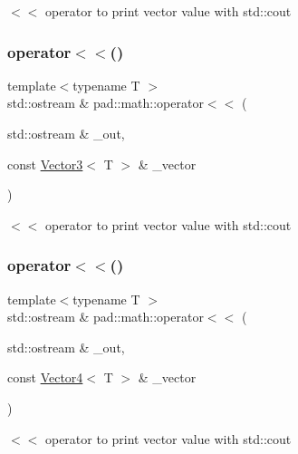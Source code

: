 $<$$<$ operator to print vector value with std\+::cout \mbox{\label{namespacepad_1_1math_a9e468612d54c187ec0eaac48e304e673}} 
\subsubsection{\texorpdfstring{operator$<$$<$()}{operator<<()}\hspace{0.1cm}{\footnotesize\ttfamily [2/3]}}
{\footnotesize\ttfamily template$<$typename T $>$ \\
std\+::ostream \& pad\+::math\+::operator$<$$<$ (\begin{DoxyParamCaption}\item[{std\+::ostream \&}]{\+\_\+out,  }\item[{const \mbox{\hyperlink{structpad_1_1math_1_1_vector3}{Vector3}}$<$ T $>$ \&}]{\+\_\+vector }\end{DoxyParamCaption})}

$<$$<$ operator to print vector value with std\+::cout \mbox{\label{namespacepad_1_1math_aea739f95f7147095cec34ccedee7eea2}} 
\subsubsection{\texorpdfstring{operator$<$$<$()}{operator<<()}\hspace{0.1cm}{\footnotesize\ttfamily [3/3]}}
{\footnotesize\ttfamily template$<$typename T $>$ \\
std\+::ostream \& pad\+::math\+::operator$<$$<$ (\begin{DoxyParamCaption}\item[{std\+::ostream \&}]{\+\_\+out,  }\item[{const \mbox{\hyperlink{structpad_1_1math_1_1_vector4}{Vector4}}$<$ T $>$ \&}]{\+\_\+vector }\end{DoxyParamCaption})}

$<$$<$ operator to print vector value with std\+::cout 
